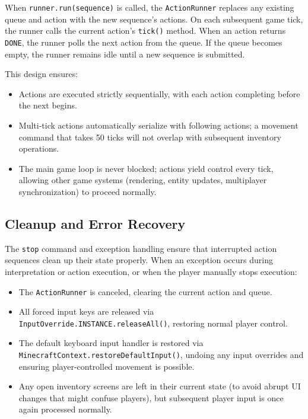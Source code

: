 When \texttt{runner.run(sequence)} is called, the \texttt{ActionRunner} replaces any existing queue and action with the new sequence's actions.
On each subsequent game tick, the runner calls the current action's \texttt{tick()} method.
When an action returns \texttt{DONE}, the runner polls the next action from the queue.
If the queue becomes empty, the runner remains idle until a new sequence is submitted.

This design ensures:
\begin{itemize}
\item[--] Actions are executed strictly sequentially, with each action completing before the next begins.
\item[--] Multi-tick actions automatically serialize with following actions; a movement command that takes 50 ticks will not overlap with subsequent inventory operations.
\item[--] The main game loop is never blocked; actions yield control every tick, allowing other game systems (rendering, entity updates, multiplayer synchronization) to proceed normally.
\end{itemize}

\subsection{Cleanup and Error Recovery}

The \texttt{stop} command and exception handling ensure that interrupted action sequences clean up their state properly.
When an exception occurs during interpretation or action execution, or when the player manually stops execution:

\begin{itemize}
\item[--] The \texttt{ActionRunner} is canceled, clearing the current action and queue.
\item[--] All forced input keys are released via \texttt{InputOverride.INSTANCE.releaseAll()}, restoring normal player control.
\item[--] The default keyboard input handler is restored via \texttt{MinecraftContext.restoreDefaultInput()}, undoing any input overrides and ensuring player-controlled movement is possible.
\item[--] Any open inventory screens are left in their current state (to avoid abrupt UI changes that might confuse players), but subsequent player input is once again processed normally.
\end{itemize}

